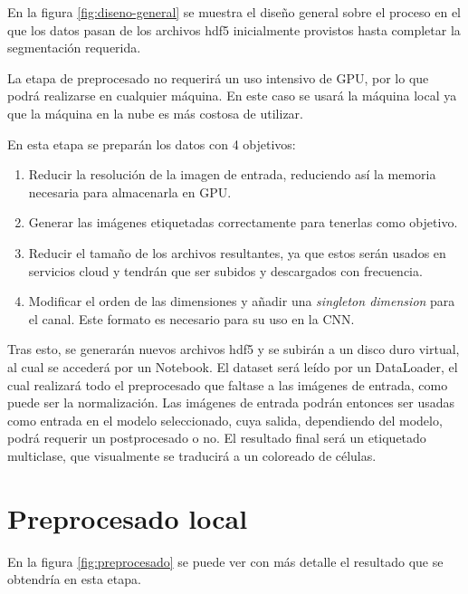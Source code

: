 \pagebreak {}

En la figura \ref{fig:diseno-general} se muestra el diseño general sobre el proceso en el que los datos pasan de los archivos hdf5 inicialmente provistos hasta completar la segmentación requerida.

La etapa de preprocesado no requerirá un uso intensivo de GPU, por lo que podrá realizarse en cualquier máquina. En este caso se usará la máquina local ya que la máquina en la nube es más costosa de utilizar.

En esta etapa se preparán los datos con 4 objetivos:
\begin{enumerate}
\item Reducir la resolución de la imagen de entrada, reduciendo así la memoria necesaria para almacenarla en GPU.
\item Generar las imágenes etiquetadas correctamente para tenerlas como objetivo.
\item Reducir el tamaño de los archivos resultantes, ya que estos serán usados en servicios cloud y tendrán que ser subidos y descargados con frecuencia.
\item Modificar el orden de las dimensiones y añadir una \textit{singleton dimension} para el canal. Este formato es necesario para su uso en la CNN.
\end{enumerate}

Tras esto, se generarán nuevos archivos hdf5 y se subirán a un disco duro virtual, al cual se accederá por un Notebook. El dataset será leído por un DataLoader, el cual realizará todo el preprocesado que faltase a las imágenes de entrada, como puede ser la normalización. Las imágenes de entrada podrán entonces ser usadas como entrada en el modelo  seleccionado, cuya salida, dependiendo del modelo, podrá requerir un postprocesado o no. El resultado final será un etiquetado multiclase, que visualmente se traducirá a un coloreado de células.

\pagebreak\section{Preprocesado local}\label{sec:preprocesado-local}


En la figura \ref{fig:preprocesado} se puede ver con más detalle el resultado que se obtendría en esta etapa. 

